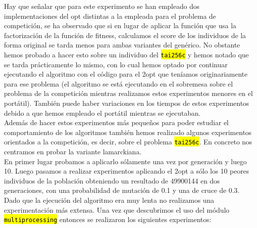 \documentclass[10pt,a4paper]{article}
\newcommand{\code}[1]{\sethlcolor{light-gray}\hl{\texttt{#1}}} %
\begin{document}
Hay que señalar que para este experimento se han empleado dos implementaciones del opt distintas a la empleada para el problema de competición, se ha observado que si en lugar de aplicar la función que usa la factorización de la función de fitness, calculamos el score de los individuos de la forma original se tarda menos para ambas variantes del genérico. No obstante hemos probado a hacer esto sobre un individuo del \code{tai256c} y hemos notado que se tarda prácticamente lo mismo, con lo cual hemos optado por continuar ejecutando el algoritmo con el código para el 2opt que teníamos originariamente para ese problema (el algoritmo se está ejecutando en el sobremesa sobre el problema de la competición mientras realizamos estos experimentos menores en el portátil). También puede haber variaciones en los tiempos de estos experimentos debido a que hemos empleado el portátil mientras se ejecutaban.\\

Además de hacer estos experimentos más pequeños para poder estudiar el comportamiento de los algoritmos también hemos realizado algunos experimentos orientados a la competición, es decir, sobre el problema \code{tai256c}. En concreto nos centramos en probar la variante lamarckiana.\\

En primer lugar probamos a aplicarlo sólamente una vez por generación y luego 10. Luego pasamos a realizar experimentos aplicando el 2opt a sólo los 10 peores individuos de la población obteniendo un resultado de 49900144 en dos generaciones, con una probabilidad de mutación de 0.1 y una de cruce de 0.3. Dado que la ejecución del algoritmo era muy lenta no realizamos una experimentación más extensa. Una vez que descubrimos el uso del módulo \code{multiprocessing} entonces se realizaron los siguientes experimentos:
\end{document}
